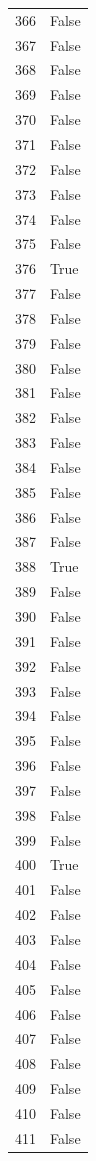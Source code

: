 \documentclass[
  letterpaper,
  DIV=11,
  numbers=noendperiod]{scrreprt}
\begin{document}
\begin{tabular}{ll}
366  &  False \\
367  &  False \\
368  &  False \\
369  &  False \\
370  &  False \\
371  &  False \\
372  &  False \\
373  &  False \\
374  &  False \\
375  &  False \\
376  &   True \\
377  &  False \\
378  &  False \\
379  &  False \\
380  &  False \\
381  &  False \\
382  &  False \\
383  &  False \\
384  &  False \\
385  &  False \\
386  &  False \\
387  &  False \\
388  &   True \\
389  &  False \\
390  &  False \\
391  &  False \\
392  &  False \\
393  &  False \\
394  &  False \\
395  &  False \\
396  &  False \\
397  &  False \\
398  &  False \\
399  &  False \\
400  &   True \\
401  &  False \\
402  &  False \\
403  &  False \\
404  &  False \\
405  &  False \\
406  &  False \\
407  &  False \\
408  &  False \\
409  &  False \\
410  &  False \\
411  &  False \\

\end{tabular}
\end{document}

